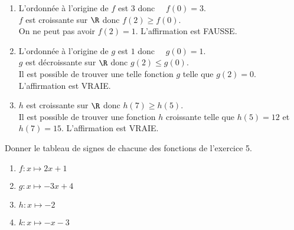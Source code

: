 \documentclass[a4paper,11pt,exos]{nsi} %
\begin{document}
\begin{enumerate}
	\item 	%
	L'ordonnée à l'origine de $f$ est $3$ donc $\quad f(0)=3$.\\
	$f$ est croissante sur $\R$ donc $f(2)\geqslant f(0)$.\\
	On ne peut pas avoir $f(2) = 1$. L'affirmation est FAUSSE.
	\item 	%
	L'ordonnée à l'origine de $g$ est $1$ donc $\quad g(0)=1$.\\
	$g$ est décroissante sur $\R$ donc $g(2)\leqslant g(0)$.\\
	Il est possible de trouver une telle fonction $g$ telle que $g(2)=0$. L'affirmation est VRAIE.
	\item	%
	$h$ est croissante sur $\R$ donc $h(7)\geqslant h(5)$.\\
	Il est possible de trouver une fonction $h$ croissante telle que $h(5)=12$ et $h(7)=15$. L'affirmation est VRAIE. 
\end{enumerate}


\exo{}
Donner le tableau de signes de chacune des fonctions de l'exercice 5.
\begin{multicols}{2}
	\begin{enumerate}
		\item 	$f:x\mapsto2x+1$\\[.5em]
		\item 	$g:x\mapsto-3x+4$\\[.5em]
		\item	$h:x\mapsto -2$\\[.5em]
		\item	$k:x\mapsto -x-3$\\[.5em]
	\end{enumerate}
\end{multicols}
\end{document}

